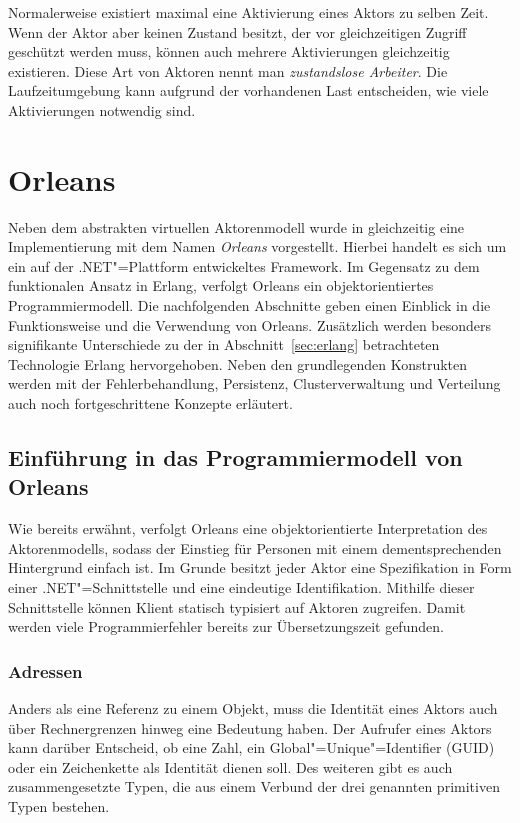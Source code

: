Normalerweise existiert maximal eine Aktivierung eines Aktors zu selben Zeit. Wenn der Aktor aber keinen Zustand besitzt, der vor gleichzeitigen Zugriff geschützt werden muss, können auch mehrere Aktivierungen gleichzeitig existieren. Diese Art von Aktoren nennt man \textsl{zustandslose Arbeiter}. Die Laufzeitumgebung kann aufgrund der vorhandenen Last entscheiden, wie viele Aktivierungen notwendig sind.

\section{Orleans}

Neben dem abstrakten virtuellen Aktorenmodell wurde in \cite{virtualActors} gleichzeitig eine Implementierung mit dem Namen \textit{Orleans} vorgestellt. Hierbei handelt es sich um ein auf der .NET"=Plattform entwickeltes Framework. Im Gegensatz zu dem funktionalen Ansatz in Erlang, verfolgt Orleans ein objektorientiertes Programmiermodell. Die nachfolgenden Abschnitte geben einen Einblick in die Funktionsweise und die Verwendung von Orleans. Zusätzlich werden besonders signifikante Unterschiede zu der in Abschnitt~\ref{sec:erlang} betrachteten Technologie Erlang hervorgehoben. Neben den grundlegenden Konstrukten werden mit der Fehlerbehandlung, Persistenz, Clusterverwaltung und Verteilung auch noch fortgeschrittene Konzepte erläutert.

\subsection{Einführung in das Programmiermodell von Orleans}

Wie bereits erwähnt, verfolgt Orleans eine objektorientierte Interpretation des Aktorenmodells, sodass der Einstieg für Personen mit einem dementsprechenden Hintergrund einfach ist. 
Im Grunde besitzt jeder Aktor eine Spezifikation in Form einer .NET"=Schnittstelle und eine eindeutige Identifikation. Mithilfe dieser Schnittstelle können Klient statisch typisiert auf Aktoren zugreifen. Damit werden viele Programmierfehler bereits zur Übersetzungszeit gefunden.

\subsubsection{Adressen}

Anders als eine Referenz zu einem Objekt, muss die Identität eines Aktors auch über Rechnergrenzen hinweg eine Bedeutung haben. Der Aufrufer eines Aktors kann darüber Entscheid, ob eine Zahl, ein Global"=Unique"=Identifier (GUID) oder ein Zeichenkette als Identität dienen soll. Des weiteren gibt es auch zusammengesetzte Typen, die aus einem Verbund der drei genannten primitiven Typen bestehen.

